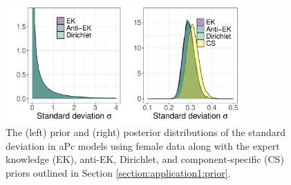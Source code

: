 \begin{figure}[!ht]
    \centering
    \includegraphics[width=0.8\textwidth]{Figures/compare_plots_s0_f.pdf}
    \caption{The (left) prior and (right) posterior distributions of the standard deviation in aPc models using female data along with the expert knowledge (EK), anti-EK, Dirichlet, and component-specific (CS) priors outlined in Section \ref{section:application1:prior}. }
    \label{figure:Application1:s0_f}
\end{figure}

